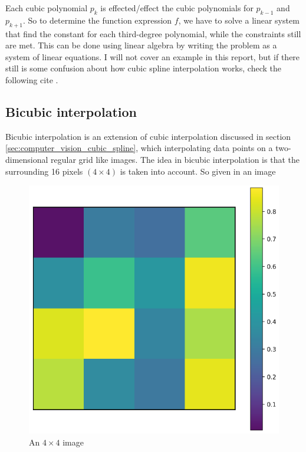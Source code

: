 \documentclass[11pt]{article}
\begin{document}
Each cubic polynomial $p_{k}$ is effected/effect the cubic polynomials for $p_{k - 1}$ and $p_{k + 1}$. So to determine the function expression $f$, we have to solve a linear system that find the constant for each third-degree polynomial, while the constraints still are met. This can be done using linear algebra by writing the problem as a system of linear equations. I will not cover an example in this report, but if there still is some confusion about how cubic spline interpolation works, check the following cite \cite{cubic_spline}.

\subsection{Bicubic interpolation}\label{sec:bicuibc_interpolation}

Bicubic interpolation is an extension of cubic interpolation discussed in section \ref{sec:computer_vision_cubic_spline}, which interpolating data points on a two-dimensional regular grid like images.
The idea in bicubic interpolation is that the surrounding 16 pixels $(4 \times 4)$ is taken into account. So given in an image

\begin{figure}[!h]
    \centering
    \includegraphics[scale=0.25]{figurer/computer_vision/bicubic_1.png}
    \caption{An $4 \times 4$ image}
    \label{fig:bicubic_1}
\end{figure}
\end{document}
